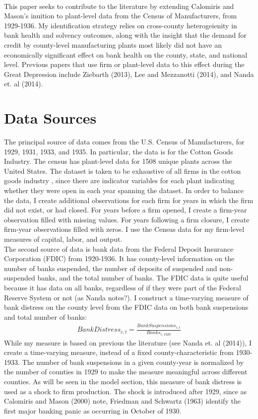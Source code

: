 \documentclass[letter,11pt]{article}
\begin{document}
{\\
\indent This paper seeks to contribute to the literature by extending Calomiris and Mason's inuition to plant-level data from the Census of Manufacturers, from 1929-1936. My identification strategy relies on cross-county heterogeienity in bank health and solvency outcomes, along with the insight that the demand for credit by county-level manufacturing plants most likely did not have an economically significant effect on bank health on the county, state, and national level. Previous papers that use firm or plant-level data to this effect during the Great Depression include Ziebarth (2013), Lee and Mezzanotti (2014), and Nanda et. al (2014). 

\section{Data Sources}
\indent The principal source of data comes from the U.S. Census of Manufacturers, for 1929, 1931, 1933, and 1935. In particular, the data is for the Cotton Goods Industry. The census has plant-level data for 1508 unique plants across the United States. The dataset is taken to be exhaustive of all firms in the cotton goods industry , since there are indicator variables for each plant indicating whether they were open in each year spanning the dataset. In order to balance the data, I create additional observations for each firm for years in which the firm did not exist, or had closed. For years before a firm opened, I create a firm-year observation filled with missing values. For years following a firm closure, I create firm-year observations filled with zeros. I use the Census data for my firm-level measures of capital, labor, and output. 
\\
\indent The second source of data is bank data from the Federal Deposit Insurance Corporation (FDIC) from 1920-1936. It has county-level information on the number of banks suspended, the number of deposits of suspended and non-suspended banks, and the total number of banks. The FDIC data is quite useful because it has data on all banks, regardless of if they were part of the Federal Reserve System or not (as Nanda notes?). I construct a time-varying measure of bank distress on the county level from the FDIC data on both bank suspensions and total number of banks:
\begin{align*}
BankDistress_{c, t} = \frac{BankSuspensions_{c, t}} {Banks_{c, 1929}}
\end{align*}
While my measure is based on previous the literature (see Nanda et. al (2014)), I create a time-varying measure, instead of a fixed county-characteristic from 1930-1933. The number of bank suspensions in a given county-year is normalized by the number of counties in 1929 to make the measure meaningful across different counties. As will be seen in the model section, this measure of bank distress is used as a shock to firm production. The shock is introduced after 1929, since as Calomiris and Mason (2000) note, Friedman and Schwartz (1963) identify the first major banking panic as occurring in October of 1930.  
}
\end{document}

